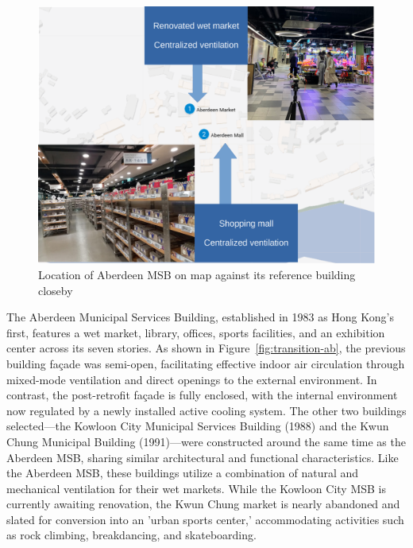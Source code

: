\documentclass[preprint,12pt]{elsarticle}
\begin{document}
\begin{figure}[h]
    \centering
    \includegraphics[width=0.5\linewidth]{img/aberdeen_map.png}
    \caption{Location of Aberdeen MSB on map against its reference building closeby}
    \label{fig:ab-ref}
\end{figure}

The Aberdeen Municipal Services Building, established in 1983 as Hong Kong's first, features a wet market, library, offices, sports facilities, and an exhibition center across its seven stories. As shown in Figure~\ref{fig:transition-ab}, the previous building façade was semi-open, facilitating effective indoor air circulation through mixed-mode ventilation and direct openings to the external environment. In contrast, the post-retrofit façade is fully enclosed, with the internal environment now regulated by a newly installed active cooling system. The other two buildings selected—the Kowloon City Municipal Services Building (1988) and the Kwun Chung Municipal Building (1991)—were constructed around the same time as the Aberdeen MSB, sharing similar architectural and functional characteristics. Like the Aberdeen MSB, these buildings utilize a combination of natural and mechanical ventilation for their wet markets. While the Kowloon City MSB is currently awaiting renovation, the Kwun Chung market is nearly abandoned and slated for conversion into an 'urban sports center,' accommodating activities such as rock climbing, breakdancing, and skateboarding.

\end{document}
